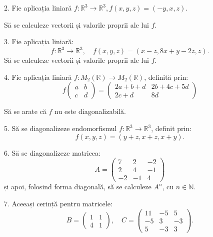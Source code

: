 \documentclass[11pt,a4paper]{article}
\newcommand\NN{\mathbb{N}}
\newcommand\RR{\mathbb{R}}
\theoremstyle{dotless}
\theoremstyle{dotlessdr}
\begin{document}
\vspace{1cm}

2. Fie aplicația liniară $f : \RR^3 \to \RR^3, f(x, y, z) = (-y, x, z)$.

Să se calculeze vectorii și valorile proprii ale lui $f$.

\vspace{1cm}

3. Fie aplicația liniară:
\[
  f : \RR^3 \to \RR^3, \quad f(x, y, z) = (x - z, 8x + y - 2z, z).
\]
Să se calculeze vectorii și valorile proprii ale lui $f$.

\vspace{1cm}

4. Fie aplicația liniară $f : M_2(\RR) \to M_2(\RR)$, definită prin:
\[
  f \begin{pmatrix}
    a & b \\
    c & d
  \end{pmatrix} = \begin{pmatrix}
    2a + b + d & 2b + 4c + 5d \\
    2c + d & 8d
  \end{pmatrix}
\]

Să se arate că $f$ nu este diagonalizabilă.

\vspace{1cm}

5. Să se diagonalizeze endomorfismul $f : \RR^3 \to \RR^3$, definit prin:
\[
  f(x, y, z) = (y + z, x + z, x + y).
\]

\vspace{1cm}

6. Să se diagonalizeze matricea:
\[
  A = \begin{pmatrix}
    7 & 2 & -2 \\
    2 & 4 & -1 \\
    -2 & -1 & 4
  \end{pmatrix}
\]
și apoi, folosind forma diagonală, să se calculeze $A^n$, cu $n \in \NN$.

\vspace{1cm}

7. Aceeași cerință pentru matricele:
\[
  B = \begin{pmatrix}
    1 & 1 \\
    4 & 1 
  \end{pmatrix}, \quad
  C = \begin{pmatrix}
    11 & -5 & 5 \\
    -5 & 3 & -3 \\
    5 & -3 & 3
  \end{pmatrix}.
\]
\end{document}
